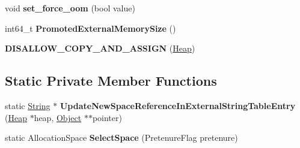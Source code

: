 \begin{DoxyCompactItemize}
\item 
void {\bfseries set\+\_\+force\+\_\+oom} (bool value)\hypertarget{classv8_1_1internal_1_1_heap_a3d2d8a4610374a6fb665444e193fa6fc}{}\label{classv8_1_1internal_1_1_heap_a3d2d8a4610374a6fb665444e193fa6fc}

\item 
int64\+\_\+t {\bfseries Promoted\+External\+Memory\+Size} ()\hypertarget{classv8_1_1internal_1_1_heap_ae5401cb498c326233258321fb441b916}{}\label{classv8_1_1internal_1_1_heap_ae5401cb498c326233258321fb441b916}

\item 
{\bfseries D\+I\+S\+A\+L\+L\+O\+W\+\_\+\+C\+O\+P\+Y\+\_\+\+A\+N\+D\+\_\+\+A\+S\+S\+I\+GN} (\hyperlink{classv8_1_1internal_1_1_heap}{Heap})\hypertarget{classv8_1_1internal_1_1_heap_a5481d753e70b670f5212e161bbb6ee91}{}\label{classv8_1_1internal_1_1_heap_a5481d753e70b670f5212e161bbb6ee91}

\end{DoxyCompactItemize}
\subsection*{Static Private Member Functions}
\begin{DoxyCompactItemize}
\item 
static \hyperlink{classv8_1_1internal_1_1_string}{String} $\ast$ {\bfseries Update\+New\+Space\+Reference\+In\+External\+String\+Table\+Entry} (\hyperlink{classv8_1_1internal_1_1_heap}{Heap} $\ast$heap, \hyperlink{classv8_1_1internal_1_1_object}{Object} $\ast$$\ast$pointer)\hypertarget{classv8_1_1internal_1_1_heap_a50f682a1e41c18314317be4088364a81}{}\label{classv8_1_1internal_1_1_heap_a50f682a1e41c18314317be4088364a81}

\item 
static Allocation\+Space {\bfseries Select\+Space} (Pretenure\+Flag pretenure)\hypertarget{classv8_1_1internal_1_1_heap_a032b16ca2f45216eac8b68570e532e9c}{}\label{classv8_1_1internal_1_1_heap_a032b16ca2f45216eac8b68570e532e9c}

\end{DoxyCompactItemize}

